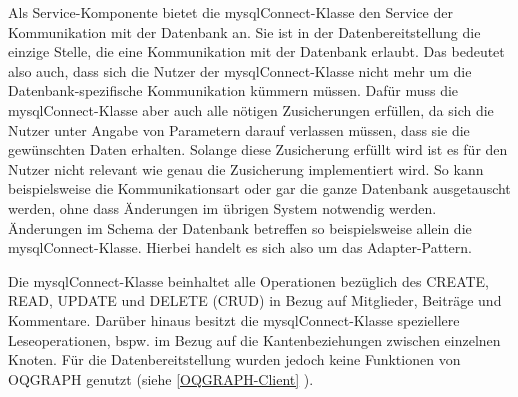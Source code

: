 Als Service-Komponente bietet die mysqlConnect-Klasse den Service der Kommunikation mit der Datenbank an. Sie ist in der Datenbereitstellung die einzige Stelle, die eine Kommunikation mit der Datenbank erlaubt. Das bedeutet also auch, dass sich die Nutzer der mysqlConnect-Klasse nicht mehr um die Datenbank-spezifische Kommunikation kümmern müssen. Dafür muss die mysqlConnect-Klasse aber auch alle nötigen Zusicherungen erfüllen, da sich die Nutzer unter Angabe von Parametern darauf verlassen müssen, dass sie die gewünschten Daten erhalten. Solange diese Zusicherung erfüllt wird ist es für den Nutzer nicht relevant wie genau die Zusicherung implementiert wird. So kann beispielsweise die Kommunikationsart oder gar die ganze Datenbank ausgetauscht werden, ohne dass Änderungen im übrigen System notwendig werden. Änderungen im Schema der Datenbank betreffen so beispielsweise allein die mysqlConnect-Klasse. Hierbei handelt es sich also um das Adapter-Pattern.

Die mysqlConnect-Klasse beinhaltet alle Operationen bezüglich des CREATE, READ, UPDATE und DELETE (CRUD) in Bezug auf Mitglieder, Beiträge und Kommentare. Darüber hinaus besitzt die mysqlConnect-Klasse speziellere Leseoperationen, bspw. im Bezug auf die Kantenbeziehungen zwischen einzelnen Knoten. Für die Datenbereitstellung wurden jedoch keine Funktionen von OQGRAPH genutzt (siehe \ref{OQGRAPH-Client} ).

